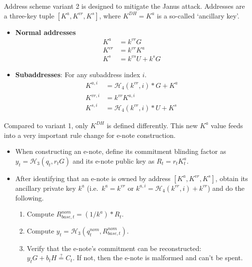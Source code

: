 Address scheme variant 2 is designed to mitigate the Janus attack. Addresses are a three-key tuple $[K^a, K^{vr}, K^s]$, where $K^{DH} = K^a$ is a so-called `ancillary key'.

\begin{itemize}
    \item \textbf{Normal addresses}
    \begin{align*}
        K^a &= k^{vr} G  \\
        K^{vr} &= k^{vr} K^a  \\
        K^{s} &= k^{vs} U + k^s G
    \end{align*}

    \item \textbf{Subaddresses}: For any subaddress index $i$.\vspace{.115cm}
    \begin{align*}
        K^{a,i} &= \mathcal{H}_4(k^{vr},i)*G + K^a  \\
        K^{vr,i} &= k^{vr} K^{a,i}  \\
        K^{s,i} &= \mathcal{H}_4(k^{vr},i)*U + K^s
    \end{align*}
\end{itemize}

Compared to variant 1, only $K^{DH}$ is defined differently. This new $K^a$ value feeds into a very important rule change for e-note construction.

\begin{itemize}
    \item When constructing an e-note, define its commitment blinding factor as $y_t = \mathcal{H}_3(q_t, r_t G)$ and its e-note public key as $R_t = r_t K^a_t$.

    \item After identifying that an e-note is owned by address $[K^a, K^{vr}, K^s]$, obtain its ancillary private key $k^a$ (i.e.\ $k^a = k^{vr}$ or $k^{a,i} = \mathcal{H}_4(k^{vr},i) + k^{vr}$) and do the following.
    \begin{enumerate}
        \item Compute $R^{nom}_{base,t} = (1/k^a)*R_t$.
        \item Compute $y_t = \mathcal{H}_3(q^{nom}_t, R^{nom}_{base,t})$.
        \item Verify that the e-note's commitment can be reconstructed: $y_t G + b_t H \stackrel{?}{=} C_t$. If not, then the e-note is malformed and can't be spent.
    \end{enumerate}
\end{itemize}

